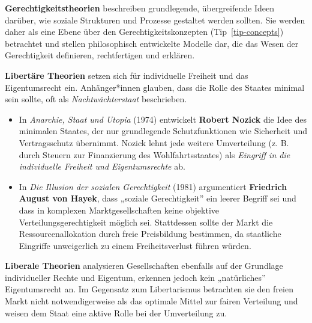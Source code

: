 \documentclass[
  nswissgerman,
  a4paper,
  openany]{book}
\newcounter{quartocallouttipno}
\newcommand{\quartocallouttip}[1]{\refstepcounter{quartocallouttipno}\label{#1}}
\begin{document}
\begin{tcolorbox}[enhanced jigsaw, arc=.35mm, bottomrule=.15mm, bottomtitle=1mm, breakable, colback=white, colbacktitle=quarto-callout-note-color!10!white, colframe=quarto-callout-note-color-frame, coltitle=black, left=2mm, leftrule=.75mm, opacityback=0, opacitybacktitle=0.6, rightrule=.15mm, title={Hinweis \ref*{tip-justice}: Gerechtigkeitstheorien}, titlerule=0mm, toprule=.15mm, toptitle=1mm]

\quartocallouttip{tip-justice} 

\textbf{Gerechtigkeitstheorien} beschreiben grundlegende, übergreifende
Ideen darüber, wie soziale Strukturen und Prozesse gestaltet werden
sollten. Sie werden daher als eine Ebene über den
Gerechtigkeitskonzepten (Tip~\ref{tip-concepts}) betrachtet und stellen
philosophisch entwickelte Modelle dar, die das Wesen der Gerechtigkeit
definieren, rechtfertigen und erklären.

\textbf{Libertäre Theorien} setzen sich für individuelle Freiheit und
das Eigentumsrecht ein. Anhänger*innen glauben, dass die Rolle des
Staates minimal sein sollte, oft als \emph{Nachtwächterstaat}
beschrieben.

\begin{itemize}
\item
  In \emph{Anarchie, Staat und Utopia} (1974) entwickelt \textbf{Robert
  Nozick} die Idee des minimalen Staates, der nur grundlegende
  Schutzfunktionen wie Sicherheit und Vertragsschutz übernimmt. Nozick
  lehnt jede weitere Umverteilung (z. B. durch Steuern zur Finanzierung
  des Wohlfahrtsstaates) als \emph{Eingriff in die individuelle Freiheit
  und Eigentumsrechte} ab.
\item
  In \emph{Die Illusion der sozialen Gerechtigkeit} (1981) argumentiert
  \textbf{Friedrich August von Hayek}, dass „soziale Gerechtigkeit'' ein
  leerer Begriff sei und dass in komplexen Marktgesellschaften keine
  objektive Verteilungsgerechtigkeit möglich sei. Stattdessen sollte der
  Markt die Ressourcenallokation durch freie Preisbildung bestimmen, da
  staatliche Eingriffe unweigerlich zu einem Freiheitsverlust führen
  würden.
\end{itemize}

\textbf{Liberale Theorien} analysieren Gesellschaften ebenfalls auf der
Grundlage individueller Rechte und Eigentum, erkennen jedoch kein
„natürliches'' Eigentumsrecht an. Im Gegensatz zum Libertarismus
betrachten sie den freien Markt nicht notwendigerweise als das optimale
Mittel zur fairen Verteilung und weisen dem Staat eine aktive Rolle bei
der Umverteilung zu.


\end{tcolorbox}
\end{document}
